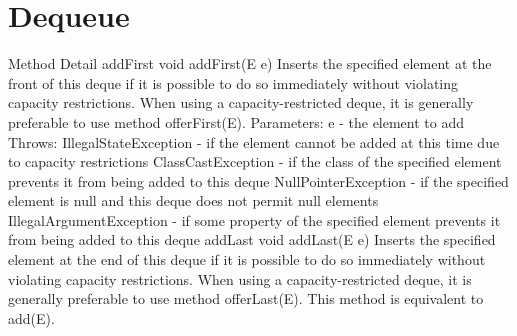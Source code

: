 \documentclass{book}
\begin{document}
\section{Dequeue}
Method Detail
addFirst
void addFirst(E e)
Inserts the specified element at the front of this deque if it is possible to do so immediately without violating capacity restrictions. When using a capacity-restricted deque, it is generally preferable to use method offerFirst(E).
Parameters:
e - the element to add
Throws:
IllegalStateException - if the element cannot be added at this time due to capacity restrictions
ClassCastException - if the class of the specified element prevents it from being added to this deque
NullPointerException - if the specified element is null and this deque does not permit null elements
IllegalArgumentException - if some property of the specified element prevents it from being added to this deque
addLast
void addLast(E e)
Inserts the specified element at the end of this deque if it is possible to do so immediately without violating capacity restrictions. When using a capacity-restricted deque, it is generally preferable to use method offerLast(E).
This method is equivalent to add(E).
\end{document}
